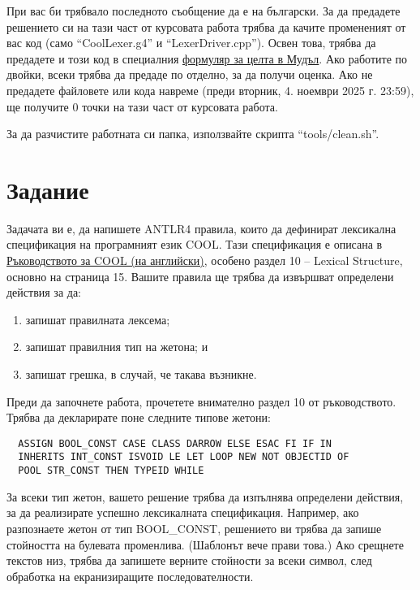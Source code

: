 \documentclass[11pt]{article}
\makeatletter
\newcommand{\verbatimfont}[1]{\def\verbatim@font{#1}}%
\makeatother
\begin{document}
При вас би трябвало последното съобщение да е на български.
За да предадете решението си на тази част от курсовата работа трябва да качите промененият от вас код (само ``CoolLexer.g4'' и ``LexerDriver.cpp'').
Освен това, трябва да предадете и този код в специалния \href{https://learn.fmi.uni-sofia.bg/mod/quiz/view.php?id=358624}{формуляр за целта в Мудъл}.
Ако работите по двойки, всеки трябва да предаде по отделно, за да получи оценка.
Ако не предадете файловете или кода навреме (преди вторник, 4. ноември 2025 г. 23:59), ще получите 0 точки на тази част от курсовата работа.

За да разчистите работната си папка, използвайте скрипта ``tools/clean.sh''.

\section{Задание}

Задачата ви е, да напишете ANTLR4 правила, които да дефинират лексикална спецификация на програмният език COOL.
Тази спецификация е описана в \href{https://web.stanford.edu/class/cs143/materials/cool-manual.pdf}{Ръководството за COOL (на английски)}, особено раздел 10 -- Lexical Structure, основно на страница 15.
Вашите правила ще трябва да извършват определени действия за да:

\begin{enumerate}
    \item запишат правилната лексема;
    \item запишат правилния тип на жетона; и
    \item запишат грешка, в случай, че такава възникне.
\end{enumerate}

Преди да започнете работа, прочетете внимателно раздел 10 от ръководството.
Трябва да декларирате поне следните типове жетони:

\verbatimfont{\CyrMono}
\begin{verbatim}
  ASSIGN BOOL_CONST CASE CLASS DARROW ELSE ESAC FI IF IN
  INHERITS INT_CONST ISVOID LE LET LOOP NEW NOT OBJECTID OF
  POOL STR_CONST THEN TYPEID WHILE
\end{verbatim}

За всеки тип жетон, вашето решение трябва да изпълнява определени действия, за да реализирате успешно лексикалната спецификация.
Например, ако разпознаете жетон от тип BOOL\_CONST, решението ви трябва да запише стойността на булевата променлива.
(Шаблонът вече прави това.)
Ако срещнете текстов низ, трябва да запишете верните стойности за всеки символ, след обработка на екранизиращите последователности.
\end{document}
